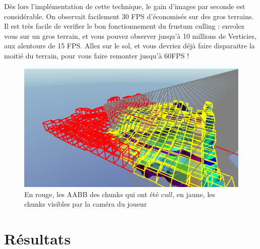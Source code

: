 \documentclass{EPUProjetDi}
\begin{document}
Dès lors l'implémentation de cette technique, le gain d'images par seconde est considérable. On observait facilement 30 FPS d'économisés sur des gros terrains.
Il est très facile de verifier le bon fonctionnement du frustum culling : envolez vous sur un gros terrain, et vous pouvez observer jusqu'à 10 millions de Verticies, aux alentours de 15 FPS. Allez sur le sol, et vous devriez déjà faire disparaitre la moitié du terrain, pour vous faire remonter jusqu'à 60FPS !

\begin{figure}[H]
	\centering
	\includegraphics[scale=.5]{frustum_culling}
	\caption{En rouge, les AABB des chunks qui ont été $cull$, en jaune, les chunks visibles par la caméra du joueur}
	\label{fig:frustum_culling}
\end{figure}



\chapter{Résultats}
\end{document}
